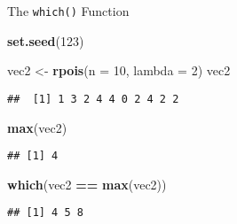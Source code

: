 \documentclass[ignorenonframetext,]{beamer}
\newenvironment{Shaded}{\begin{snugshade}}{\end{snugshade}}
\newcommand{\DataTypeTok}[1]{\textcolor[rgb]{0.13,0.29,0.53}{#1}}
\newcommand{\DecValTok}[1]{\textcolor[rgb]{0.00,0.00,0.81}{#1}}
\newcommand{\KeywordTok}[1]{\textcolor[rgb]{0.13,0.29,0.53}{\textbf{#1}}}
\newcommand{\NormalTok}[1]{#1}
\newcommand{\OperatorTok}[1]{\textcolor[rgb]{0.81,0.36,0.00}{\textbf{#1}}}
\newcommand{\StringTok}[1]{\textcolor[rgb]{0.31,0.60,0.02}{#1}}
\begin{document}
\begin{frame}[fragile]{The \texttt{which()} Function}
\protect\hypertarget{the-which-function-2}{}

\begin{Shaded}
\begin{Highlighting}[]
\KeywordTok{set.seed}\NormalTok{(}\DecValTok{123}\NormalTok{)}

\NormalTok{vec2 <-}\StringTok{ }\KeywordTok{rpois}\NormalTok{(}\DataTypeTok{n =} \DecValTok{10}\NormalTok{, }\DataTypeTok{lambda =} \DecValTok{2}\NormalTok{)}
\NormalTok{vec2}
\end{Highlighting}
\end{Shaded}

\begin{verbatim}
##  [1] 1 3 2 4 4 0 2 4 2 2
\end{verbatim}

\begin{Shaded}
\begin{Highlighting}[]
\KeywordTok{max}\NormalTok{(vec2)}
\end{Highlighting}
\end{Shaded}

\begin{verbatim}
## [1] 4
\end{verbatim}

\begin{Shaded}
\begin{Highlighting}[]
\KeywordTok{which}\NormalTok{(vec2 }\OperatorTok{==}\StringTok{ }\KeywordTok{max}\NormalTok{(vec2))}
\end{Highlighting}
\end{Shaded}

\begin{verbatim}
## [1] 4 5 8
\end{verbatim}

\end{frame}
\end{document}
